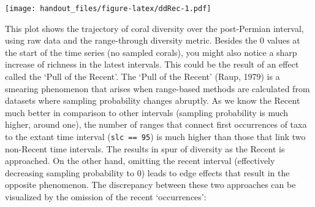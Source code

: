 \documentclass[]{article}
\newenvironment{Shaded}{\begin{snugshade}}{\end{snugshade}}
\newcommand{\CommentTok}[1]{\textcolor[rgb]{0.56,0.35,0.01}{\textit{#1}}}
\newcommand{\DataTypeTok}[1]{\textcolor[rgb]{0.13,0.29,0.53}{#1}}
\newcommand{\DecValTok}[1]{\textcolor[rgb]{0.00,0.00,0.81}{#1}}
\newcommand{\KeywordTok}[1]{\textcolor[rgb]{0.13,0.29,0.53}{\textbf{#1}}}
\newcommand{\NormalTok}[1]{#1}
\newcommand{\OperatorTok}[1]{\textcolor[rgb]{0.81,0.36,0.00}{\textbf{#1}}}
\newcommand{\StringTok}[1]{\textcolor[rgb]{0.31,0.60,0.02}{#1}}
\begin{document}
\begin{Shaded}
\end{Shaded}

\texttt{[image: handout\_files/figure-latex/ddRec-1.pdf]}

This plot shows the trajectory of coral diversity over the post-Permian
interval, using raw data and the range-through diversity metric. Besides
the 0 values at the start of the time series (no sampled corals), you
might also notice a sharp increase of richness in the latest intervals.
This could be the result of an effect called the `Pull of the Recent'.
The `Pull of the Recent' (Raup, 1979) is a smearing phenomenon that
arises when range-based methods are calculated from datasets where
sampling probability changes abruptly. As we know the Recent much better
in comparison to other intervals (sampling probability is much higher,
around one), the number of ranges that connect first occurrences of taxa
to the extant time interval (\texttt{slc\ ==\ 95}) is much higher than
those that link two non-Recent time intervals. The results in spur of
diversity as the Recent is approached. On the other hand, omitting the
recent interval (effectively decreasing sampling probability to 0) leads
to edge effects that result in the opposite phenomenon. The discrepancy
between these two approaches can be visualized by the omission of the
recent `occurrences':
\end{document}
